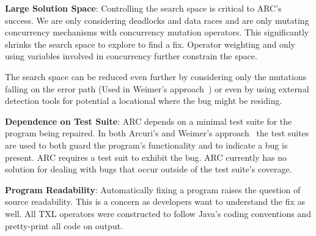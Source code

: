 \documentclass{llncs}
\begin{document}
\textbf{Large Solution Space}: Controlling the search space is critical to ARC's
success.  We are only considering
deadlocks and data races and are only mutating concurrency mechanisms with concurrency
mutation operators. This significantly shrinks the search space to explore
to find a fix. Operator weighting and only using variables involved in concurrency
further constrain the space.

The search space can be reduced even further by considering only the mutations
falling on the error path (Used in Weimer's approach~\cite{GNFW11}) or even by
using external detection tools for potential a locational where the bug might
be residing.

\textbf{Dependence on Test Suite}: ARC depends on a minimal test suite for the
program being repaired. In both Arcuri's and Weimer's
approach~\cite{AY08,GNFW11} the test suites are used to both guard the
program's functionality and to indicate a bug is present. ARC requires a test
suit to exhibit the bug. ARC currently has no solution for dealing with bugs
that occur outside of the test suite's coverage.


\textbf{Program Readability}: Automatically fixing a program
raises the question of source readability. This is a concern as developers want to
understand the fix as well. All TXL operators were constructed to follow Java's
coding conventions and pretty-print all code on output.


\end{document}
